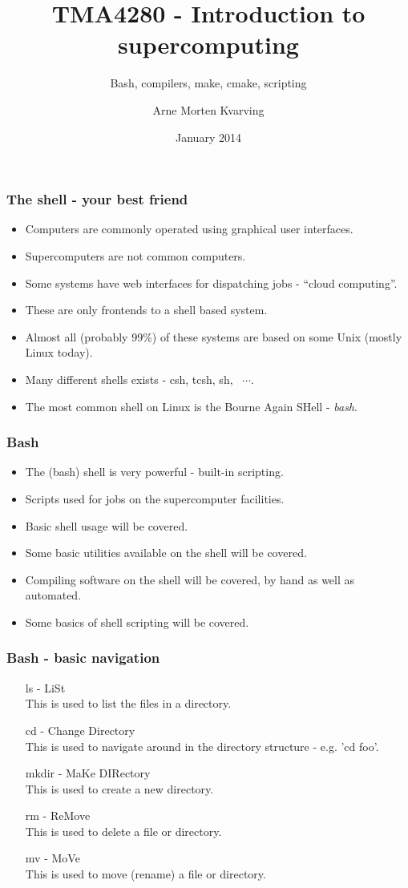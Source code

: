 \documentclass{beamer}
\title{TMA4280 - Introduction to supercomputing}
\subtitle{Bash, compilers, make, cmake, scripting}
\author{Arne Morten Kvarving}
\institute{NTNU and SINTEF ICT}
\date{January 2014}
\begin{document}
\maketitle
\begin{frame}\frametitle{The shell - your best friend}
  \begin{itemize}
    \item Computers are commonly operated using graphical user interfaces.
    \item Supercomputers are not common computers.
    \item Some systems have web interfaces for dispatching jobs - ``cloud computing''.
    \item These are only frontends to a shell based system.
    \item Almost all (probably 99\%) of these systems are based on some Unix (mostly Linux today).
    \item Many different shells exists - csh, tcsh, sh,  $\cdots$.
    \item The most common shell on Linux is the Bourne Again SHell - \emph{bash}.
  \end{itemize}
\end{frame}

\begin{frame}\frametitle{Bash}
  \begin{itemize}
    \item The (bash) shell is very powerful - built-in scripting.
    \item Scripts used for jobs on the supercomputer facilities.
    \item Basic shell usage will be covered.
    \item Some basic utilities available on the shell will be covered.
    \item Compiling software on the shell will be covered, by hand as well as automated.
    \item Some basics of shell scripting will be covered.
  \end{itemize}
\end{frame}

\begin{frame}\frametitle{Bash - basic navigation}
  \begin{itemize}
    \item[ls] - LiSt \\
      This is used to list the files in a directory.
    \item[cd] - Change Directory \\
      This is used to navigate around in the directory structure - e.g. 'cd foo'.
    \item[mkdir] - MaKe DIRectory \\
      This is used to create a new directory.
    \item[rm] - ReMove \\
      This is used to delete a file or directory.
    \item[mv] - MoVe \\
      This is used to move (rename) a file or directory.
  \end{itemize}
\end{frame}
\end{document}
